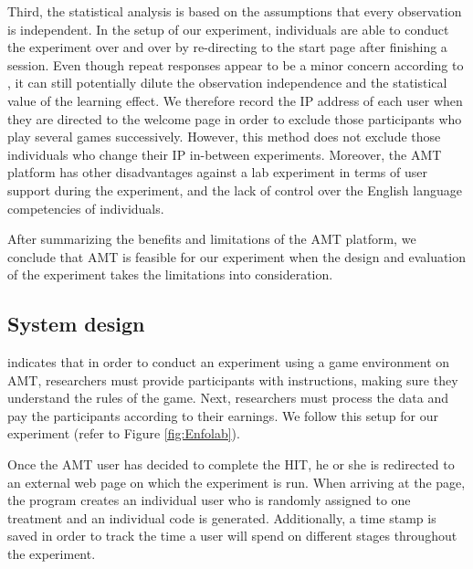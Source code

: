 Third, the statistical analysis is based on the assumptions that every observation is independent. In the setup of our experiment, individuals are able to conduct the experiment over and over by re-directing to the start page after finishing a session. Even though repeat responses appear to be a minor concern according to \cite{Berinsky2012}, it can still potentially dilute the observation independence and the statistical value of the learning effect. We therefore record the IP address of each user when they are directed to the welcome page in order to exclude those participants who play several games successively. However, this method does not exclude those individuals who change their IP in-between experiments.
Moreover, the \ac{AMT} platform has other disadvantages against a lab experiment in terms of user support during the experiment, and the lack of control over the English language competencies of individuals. 

After summarizing the benefits and limitations of the \ac{AMT} platform, we conclude that \ac{AMT} is feasible for our experiment when the design and evaluation of the experiment takes the limitations into consideration.

\subsection{System design}

\cite{Rand2012} indicates that in order to conduct an experiment using a game environment on \ac{AMT}, researchers must provide participants with instructions, making sure they understand the rules of the game. Next, researchers must process the data and pay the participants according to their earnings. We follow this setup for our experiment (refer to Figure \ref{fig:Enfolab}).

Once the \ac{AMT} user has decided to complete the \ac{HIT}, he or she is redirected to an external web page on which the experiment is run.
When arriving at the page, the program creates an individual user who is randomly assigned to one treatment and an individual code is generated. 
Additionally, a time stamp is saved in order to track the time a user will spend on different stages throughout the experiment.

